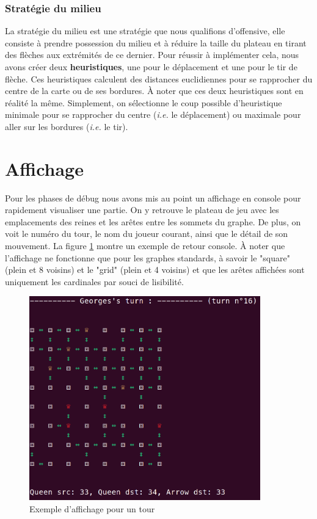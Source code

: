 \documentclass{article}
\begin{document}
\subsubsection{Stratégie du milieu}
La stratégie du milieu est une stratégie que nous qualifions d'offensive, elle consiste à prendre possession du milieu et à réduire la taille du plateau en tirant des flèches aux extrémités de ce dernier. Pour réussir à implémenter cela, nous avons créer deux \textbf{heuristiques}, une pour le déplacement et une pour le tir de flèche. Ces heuristiques calculent des distances euclidiennes pour se rapprocher du centre de la carte ou de ses bordures. À noter que ces deux heuristiques sont en réalité la même. Simplement, on sélectionne le coup possible d'heuristique minimale pour se rapprocher du centre (\textit{i.e.} le déplacement) ou maximale pour aller sur les bordures (\textit{i.e.} le tir).
\newpage
\section{Affichage}
Pour les phases de débug nous avons mis au point un affichage en console pour rapidement visualiser une partie. On y retrouve le plateau de jeu avec les emplacements des reines et les arêtes entre les sommets du graphe. De plus, on voit le numéro du tour, le nom du joueur courant, ainsi que le détail de son mouvement. La figure \ref{affi} montre un exemple de retour console. À noter que l'affichage ne fonctionne que pour les graphes standards, à savoir le "square" (plein et 8 voisins) et le "grid" (plein et 4 voisins) et que les arêtes affichées sont uniquement les cardinales par souci de lisibilité.
\vspace{2cm}
\begin{figure}[!h]
    \centering
    \includegraphics[width=10cm]{Capture d’écran du 2023-05-08 00-11-38.png}
    \caption{Exemple d'affichage pour un tour}
    \label{affi}
\end{figure}
\end{document}
